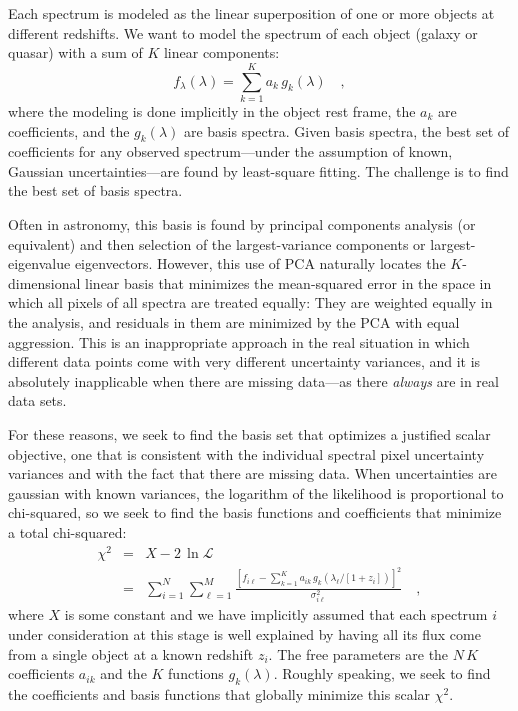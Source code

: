 \documentclass[12pt]{article}
\newcommand{\like}{\mathscr{L}}
\begin{document}
Each spectrum is modeled as the linear superposition of one or more
objects at different redshifts.  We want to model the spectrum of each
object (galaxy or quasar) with a sum of $K$ linear components:
\begin{equation}
f_{\lambda}(\lambda) = \sum_{k=1}^{K} a_k\,g_k(\lambda)
\quad ,
\end{equation}
where the modeling is done implicitly in the object rest frame, the
$a_k$ are coefficients, and the $g_k(\lambda)$ are basis spectra.
Given basis spectra, the best set of coefficients for any observed
spectrum---under the assumption of known, Gaussian uncertainties---are
found by least-square fitting.  The challenge is to find the
best set of basis spectra.

Often in astronomy, this basis is found by principal components
analysis (or equivalent) and then selection of the largest-variance
components or largest-eigenvalue eigenvectors.  However, this use of
PCA naturally locates the $K$-dimensional linear basis that minimizes
the mean-squared error in the space in which all pixels of all spectra
are treated equally: They are weighted equally in the analysis, and
residuals in them are minimized by the PCA with equal aggression.
This is an inappropriate approach in the real situation in which
different data points come with very different uncertainty variances,
and it is absolutely inapplicable when there are missing data---as
there \emph{always} are in real data sets.

For these reasons, we seek to find the basis set that optimizes a
justified scalar objective, one that is consistent with the individual
spectral pixel uncertainty variances and with the fact that there are
missing data.  When uncertainties are gaussian with known variances,
the logarithm of the likelihood is proportional to chi-squared, so we
seek to find the basis functions and coefficients that minimize a
total chi-squared:
\begin{eqnarray}\displaystyle
\chi^2 & = & X - 2\,\ln\like \nonumber\\
 & = & \sum_{i=1}^N \sum_{\ell=1}^M
\frac{\left[f_{i\ell}-\sum_{k=1}^K a_{ik}
                      \,g_k(\lambda_{\ell}/[1+z_i])\right]^2}
{\sigma^2_{i\ell}}
\quad ,
\end{eqnarray}
where $X$ is some constant and we have implicitly assumed that each
spectrum $i$ under consideration at this stage is well explained by
having all its flux come from a single object at a known redshift
$z_i$.  The free parameters are the $N\,K$ coefficients $a_{ik}$ and
the $K$ functions $g_k(\lambda)$.  Roughly speaking, we seek to find
the coefficients and basis functions that globally minimize this
scalar $\chi^2$.
\end{document}
